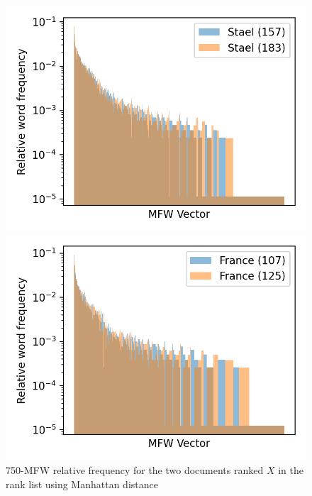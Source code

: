 \begin{figure}
  \centering
  \caption{750-MFW relative frequency for the two documents ranked $X$ in the rank list using Manhattan distance}

  \label{fig:mfw_vector_first_rl}
  \includegraphics[width=\linewidth]{img/mfw_vector_first_rl.png}

  \label{fig:mfw_vector_first_last_rl}
  \includegraphics[width=\linewidth]{img/mfw_vector_first_last_rl.png}


\end{figure}
